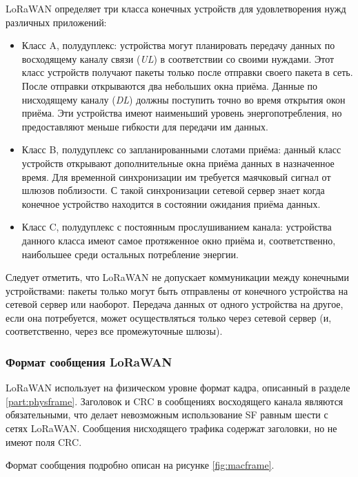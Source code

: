 LoRaWAN определяет три класса конечных устройств для удовлетворения нужд различных приложений:
\begin{itemize}
 \item Класс A, полудуплекс: устройства могут планировать передачу данных по восходящему каналу связи (\textit{UL}) в соответствии со своими нуждами. Этот класс устройств получают пакеты только после отправки своего пакета в сеть. После отправки открываются два небольших окна приёма. Данные по нисходящему каналу (\textit{DL}) должны поступить точно во время открытия окон приёма. Эти устройства имеют наименьший уровень энергопотребления, но предоставляют меньше гибкости для передачи им данных.
 \item Класс B, полудуплекс со запланированными слотами приёма: данный класс 
устройств открывают дополнительные окна приёма данных в назначенное время. Для 
временной синхронизации им требуется маячковый сигнал от шлюзов поблизости. С 
такой синхронизации сетевой сервер знает когда конечное устройство находится в 
состоянии ожидания приёма данных.
 \item Класс C, полудуплекс с постоянным прослушиванием канала: устройства данного класса имеют самое протяженное окно приёма и, соответственно, наибольшее среди остальных потребление энергии.
\end{itemize}

Следует отметить, что LoRaWAN не допускает коммуникации между конечными устройствами: пакеты только могут быть отправлены от конечного устройства на сетевой сервер или наоборот. 
Передача данных от одного устройства на другое, если она потребуется, может осуществляться только через сетевой сервер (и, соответственно, через все промежуточные шлюзы).

\subsubsection{Формат сообщения LoRaWAN} 

LoRaWAN использует на физическом уровне формат кадра, описанный в разделе \ref{part:physframe}.
Заголовок и CRC в сообщениях восходящего канала являются обязательными, что делает невозможным использование SF равным шести с сетях LoRaWAN.
Сообщения нисходящего трафика содержат заголовки, но не имеют поля CRC.

Формат сообщения подробно описан на рисунке \ref{fig:macframe}.


